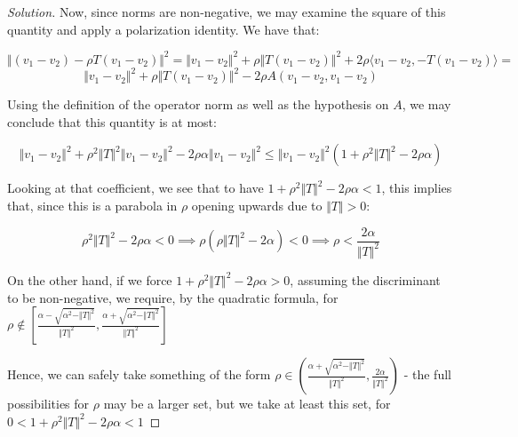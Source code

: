 \documentclass[10pt]{article}
\begin{document}
\begin{proof}[Solution]





Now, since norms are non-negative, we may examine the square of this quantity and apply a polarization identity. We have that:

$$  \Vert (v_1  - v_2) - \rho T(v_1 - v_2) \Vert^2 = \Vert v_1 - v_2 \Vert^2 + \rho \Vert T(v_1 - v_2) \Vert^2 + 2\rho \langle v_1 - v_2, -T(v_1 - v_2) \rangle =$$
$$ \Vert v_1 - v_2 \Vert^2 + \rho \Vert T(v_1 - v_2) \Vert^2 - 2\rho A(v_1 - v_2, v_1 - v_2) $$ 

Using the definition of the operator norm as well as the hypothesis on $A$, we may conclude that this quantity is at most:

$$ \Vert v_1 - v_2 \Vert^2 + \rho^2 \Vert T\Vert^2 \Vert v_1 - v_2 \Vert^2 - 2 \rho \alpha \Vert v_1 - v_2 \Vert^2 \leq \Vert v_1 - v_2 \Vert^2 ( 1 + \rho^2 \Vert T\Vert^2 - 2 \rho \alpha) $$

Looking at that coefficient, we see that to have $ 1 + \rho^2 \Vert T\Vert^2 - 2 \rho \alpha < 1$, this implies that, since this is a parabola in $\rho$ opening upwards due to $\Vert T \Vert > 0$:

$$ \rho^2 \Vert T\Vert^2 - 2 \rho \alpha < 0 \implies \rho(\rho \Vert T \Vert^2 - 2 \alpha) < 0 \implies \rho < \frac{ 2\alpha}{\Vert T\Vert^2}$$

On the other hand, if we force $1 + \rho^2 \Vert T\Vert^2 - 2 \rho \alpha > 0$, assuming the discriminant to be non-negative, we require, by the quadratic formula, for $\rho \not \in [\frac{\alpha - \sqrt{\alpha^2 - \Vert T \Vert^2}}{\Vert T \Vert^2},\frac{\alpha + \sqrt{\alpha^2 - \Vert T \Vert^2}}{\Vert T \Vert^2}] $

Hence, we can safely take something of the form $\rho \in \left(\frac{\alpha + \sqrt{\alpha^2 - \Vert T \Vert^2}}{\Vert T \Vert^2}, \frac{ 2\alpha}{\Vert T\Vert^2} \right)$ - the full possibilities for $\rho$ may be a larger set, but we take at least this set, for $0 <  1 + \rho^2 \Vert T\Vert^2 - 2 \rho \alpha < 1 $


\end{proof}
\end{document}
